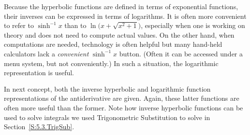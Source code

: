 Because the hyperbolic functions are defined in terms of exponential functions, their inverses can be expressed in terms of logarithms. It is often more convenient to refer to $\sinh^{-1} x$ than to $\ln\big(x+\sqrt{x^2+1}\big)$, especially when one is working on theory and does not need to compute actual values. On the other hand, when computations are needed, technology is often helpful but many hand-held calculators lack a \textit{convenient} $\sinh^{-1}x$ button. (Often it can be accessed under a menu system, but not conveniently.) In such a situation, the logarithmic representation is useful.

In next concept, both the inverse hyperbolic and logarithmic function representations of the antiderivative are given. Again, these latter functions are often more useful than the former. Note how inverse hyperbolic functions can be used to solve integrals we used Trigonometric Substitution to solve in Section~\ref{S:5.3.TrigSub}.


